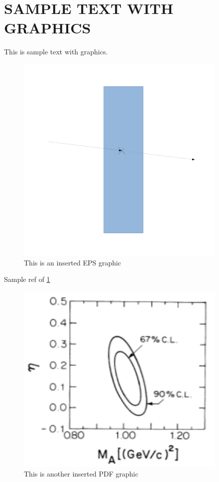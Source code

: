 \section{SAMPLE TEXT WITH GRAPHICS} \label{graphics}
\hspace{\parindent}
This is sample text with graphics.
\begin{figure}[h]
  \centering
  \includegraphics[angle=-90,width=4in]{figures/bz.pdf}
  \caption{This is an inserted EPS graphic}
  \label{fig:mygraph1}
\end{figure}
Sample ref of \ref{fig:mygraph1} 

\begin{figure}[t]
 \centering
  \includegraphics[angle=-90, width=4in]{figures/E734eta.pdf}  
    \caption{This is another inserted PDF graphic}
    \label{fig:mygraph2}
\end{figure}

